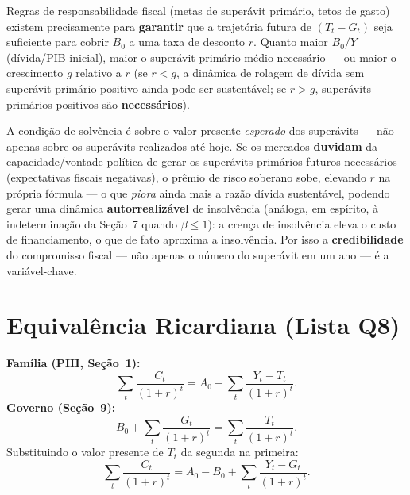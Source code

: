 \documentclass[12pt, a4paper]{article}
\begin{document}
\begin{fatorbox}[title={Implicação canônica para regras de superávit primário}]
Regras de responsabilidade fiscal (metas de superávit primário, tetos de
gasto) existem precisamente para \textbf{garantir} que a trajetória futura de
$(T_t-G_t)$ seja suficiente para cobrir $B_0$ a uma taxa de desconto $r$.
Quanto maior $B_0/Y$ (dívida/PIB inicial), maior o superávit primário médio
necessário --- ou maior o crescimento $g$ relativo a $r$ (se $r<g$, a
dinâmica de rolagem de dívida sem superávit primário positivo ainda pode ser
sustentável; se $r>g$, superávits primários positivos são \textbf{necessários}).
\end{fatorbox}

\begin{provabox}[title={Papel das expectativas fiscais para a solvência}]
A condição de solvência é sobre o valor presente \emph{esperado} dos
superávits --- não apenas sobre os superávits realizados até hoje. Se os
mercados \textbf{duvidam} da capacidade/vontade política de gerar os
superávits primários futuros necessários (expectativas fiscais negativas), o
prêmio de risco soberano sobe, elevando $r$ na própria fórmula --- o que
\emph{piora} ainda mais a razão dívida sustentável, podendo gerar uma
dinâmica \textbf{autorrealizável} de insolvência (análoga, em espírito, à
indeterminação da Seção~7 quando $\beta\le 1$): a crença de insolvência eleva
o custo de financiamento, o que de fato aproxima a insolvência. Por isso a
\textbf{credibilidade} do compromisso fiscal --- não apenas o número do
superávit em um ano --- é a variável-chave.
\end{provabox}

\section{Equivalência Ricardiana (Lista Q8)}

\begin{formulabox}[title={Derivação a partir das duas restrições intertemporais}]
\textbf{Família (PIH, Seção~1):}
\[
  \sum_t \frac{C_t}{(1+r)^t} = A_0 + \sum_t \frac{Y_t - T_t}{(1+r)^t}.
\]
\textbf{Governo (Seção~9):}
\[
  B_0 + \sum_t \frac{G_t}{(1+r)^t} = \sum_t \frac{T_t}{(1+r)^t}.
\]
Substituindo o valor presente de $T_t$ da segunda na primeira:
\[
  \sum_t \frac{C_t}{(1+r)^t} = A_0 - B_0 + \sum_t \frac{Y_t - G_t}{(1+r)^t}.
\]
\end{formulabox}
\end{document}
